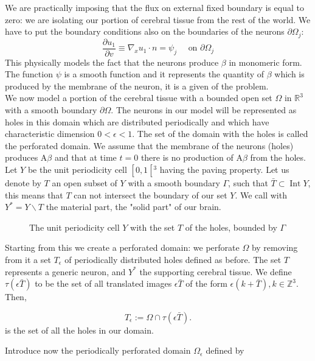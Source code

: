 We are practically imposing that the flux on external fixed boundary is equal to zero: we are isolating our portion of cerebral tissue from the rest of the world.
We have to put the boundary conditions also on the boundaries of the neurons $\partial\Omega_{j}$:
$$ 
\frac{\partial u_{1}}{\partial v} \equiv \nabla_{x} u_1 \cdot n= \psi_{j} \quad \text { on } \partial\Omega_{j}
$$
This physically models the fact that the neurons produce \(\beta\) in monomeric form. The function $\psi$ is a smooth function and it represents the quantity of \(\beta\) which is produced by the membrane of the neuron, it is a given of the problem.\\
We now model a portion of the cerebral tissue with a bounded open set $\Omega$ in $\mathbb{R}^{3}$ with a smooth boundary $\partial \Omega$. The neurons in our model will be represented as holes in this domain which are distributed periodically and which have characteristic dimension $0<\epsilon<1$. The set of the domain with the holes is called the perforated domain.
We assume that the membrane of the neurons (holes) produces $\mathrm{A} \beta$ and that at time $t=0$ there is no production of  $\mathrm{A} \beta$ from the holes. \\
Let $Y$ be the unit periodicity cell $\left[0,1\left[{ }^{3}\right.\right.$ having the paving property. 
Let us denote by $T$ an open subset of $Y$ with a smooth boundary $\Gamma$, such that $\bar{T} \subset \operatorname{Int} Y$, this means that $T$ can not intersect the boundary of our set $Y$. We call with $Y^{*}=Y \backslash T$ the material part, the "solid part" of our brain.
\begin{figure}[H]
    \centering
    \caption{The unit periodicity cell $Y$ with the set $T$ of the holes, bounded by \(\Gamma\)}
    \label{fig:unit_cell}
  \end{figure}

Starting from this we create a perforated domain: we perforate $\Omega$ by removing from it a set $T_{\epsilon}$ of periodically distributed holes defined as before. The set $T$ represents a generic neuron, and $Y^{*}$ the supporting cerebral tissue. We define $\tau(\epsilon \bar{T})$ to be the set of all translated images $\epsilon \bar{T}$ of the form $\epsilon(k+\bar{T}), k \in \mathbb{Z}^{3}$. Then,

\[ T_{\epsilon}:=\Omega \cap \tau(\epsilon \bar{T}) . \] is the set of all the holes in our domain.

Introduce now the periodically perforated domain $\Omega_{\epsilon}$ defined by

